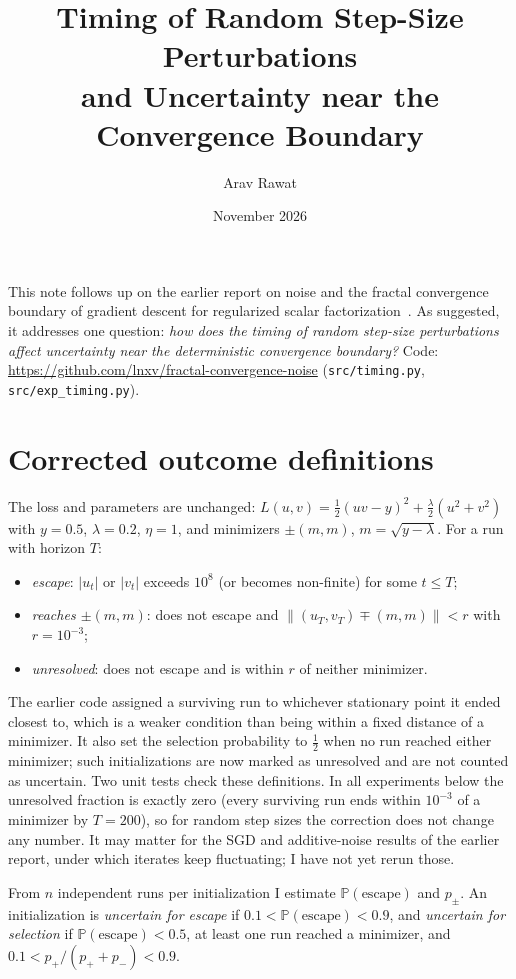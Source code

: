 \documentclass[11pt]{article}
\title{Timing of Random Step-Size Perturbations\\ and Uncertainty near the Convergence Boundary}
\author{Arav Rawat}
\date{November 2026}
\newcommand{\Prob}{\mathbb{P}}
\begin{document}
\maketitle

\noindent
This note follows up on the earlier report on noise and the fractal convergence boundary of gradient descent for regularized scalar factorization~\cite{liang2026}. As suggested, it addresses one question: \emph{how does the timing of random step-size perturbations affect uncertainty near the deterministic convergence boundary?} Code: \url{https://github.com/lnxv/fractal-convergence-noise} (\texttt{src/timing.py}, \texttt{src/exp\_timing.py}).

\section{Corrected outcome definitions}

The loss and parameters are unchanged: $L(u,v)=\tfrac12(uv-y)^2+\tfrac{\lambda}{2}(u^2+v^2)$ with $y=0.5$, $\lambda=0.2$, $\eta=1$, and minimizers $\pm(m,m)$, $m=\sqrt{y-\lambda}$. For a run with horizon $T$:
\begin{itemize}
  \item \emph{escape}: $|u_t|$ or $|v_t|$ exceeds $10^8$ (or becomes non-finite) for some $t\le T$;
  \item \emph{reaches $\pm(m,m)$}: does not escape and $\|(u_T,v_T)\mp(m,m)\|<r$ with $r=10^{-3}$;
  \item \emph{unresolved}: does not escape and is within $r$ of neither minimizer.
\end{itemize}
The earlier code assigned a surviving run to whichever stationary point it ended closest to, which is a weaker condition than being within a fixed distance of a minimizer. It also set the selection probability to $\tfrac12$ when no run reached either minimizer; such initializations are now marked as unresolved and are not counted as uncertain. Two unit tests check these definitions. In all experiments below the unresolved fraction is exactly zero (every surviving run ends within $10^{-3}$ of a minimizer by $T=200$), so for random step sizes the correction does not change any number. It may matter for the SGD and additive-noise results of the earlier report, under which iterates keep fluctuating; I have not yet rerun those.

From $n$ independent runs per initialization I estimate $\Prob(\text{escape})$ and $p_\pm$. An initialization is \emph{uncertain for escape} if $0.1<\Prob(\text{escape})<0.9$, and \emph{uncertain for selection} if $\Prob(\text{escape})<0.5$, at least one run reached a minimizer, and $0.1<p_+/(p_++p_-)<0.9$.
\end{document}
